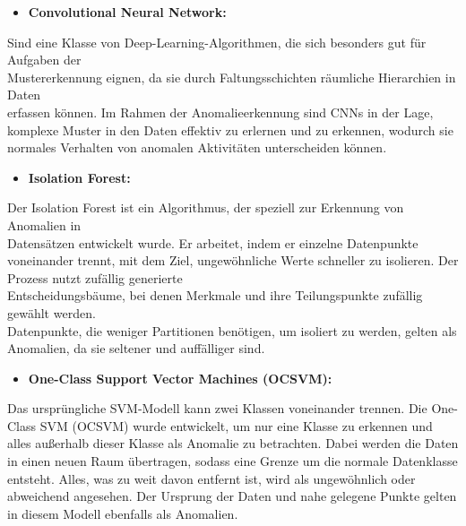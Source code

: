 \begin{itemize} \item \textbf{Convolutional Neural Network:} \end{itemize}  Sind eine
Klasse von Deep-Learning-Algorithmen, die sich besonders gut für Aufgaben der \\ Mustererkennung eignen, da sie durch Faltungsschichten räumliche Hierarchien in Daten \\ erfassen können. Im Rahmen der Anomalieerkennung sind CNNs in der Lage, komplexe Muster in den Daten
effektiv zu erlernen und zu erkennen, wodurch sie normales Verhalten von anomalen Aktivitäten unterscheiden können\cite{Fallbeispiel}.

   \begin{itemize} \item \textbf{Isolation Forest:} \end{itemize} Der Isolation Forest ist ein Algorithmus, der speziell zur Erkennung von Anomalien in \\ Datensätzen entwickelt wurde. Er arbeitet, indem er einzelne Datenpunkte voneinander trennt, mit dem Ziel, ungewöhnliche Werte schneller zu isolieren. Der Prozess nutzt zufällig generierte \\ Entscheidungsbäume, bei denen Merkmale und ihre Teilungspunkte zufällig gewählt werden. \\ Datenpunkte, die weniger Partitionen benötigen, um isoliert zu werden, gelten als Anomalien, da sie seltener und auffälliger sind\cite{Forest}. 
 \\
\begin{itemize} \item \textbf{One-Class Support Vector Machines (OCSVM):} \end{itemize} Das ursprüngliche SVM-Modell kann zwei Klassen voneinander trennen. Die One-Class SVM (OCSVM) wurde entwickelt, um nur eine Klasse zu erkennen und alles außerhalb dieser Klasse als Anomalie zu betrachten.
Dabei werden die Daten in einen neuen Raum übertragen, sodass eine Grenze um die normale Datenklasse entsteht. Alles, was zu weit davon entfernt ist, wird als ungewöhnlich oder abweichend angesehen. Der Ursprung der Daten und nahe gelegene Punkte gelten in diesem Modell ebenfalls als Anomalien\cite{Lernen}.
 
